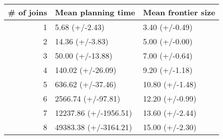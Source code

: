 \begin{tabular}{rll}
\toprule
 \# of joins &     Mean planning time & Mean frontier size \\
\midrule
          1 &         5.68 (+/-2.43) &     3.40 (+/-0.49) \\
          2 &        14.36 (+/-3.83) &     5.00 (+/-0.00) \\
          3 &       50.00 (+/-13.88) &     7.00 (+/-0.64) \\
          4 &      140.02 (+/-26.09) &     9.20 (+/-1.18) \\
          5 &      636.62 (+/-37.46) &    10.80 (+/-1.48) \\
          6 &     2566.74 (+/-97.81) &    12.20 (+/-0.99) \\
          7 &  12237.86 (+/-1956.51) &    13.60 (+/-2.44) \\
          8 &  49383.38 (+/-3164.21) &    15.00 (+/-2.30) \\
\bottomrule
\end{tabular}
